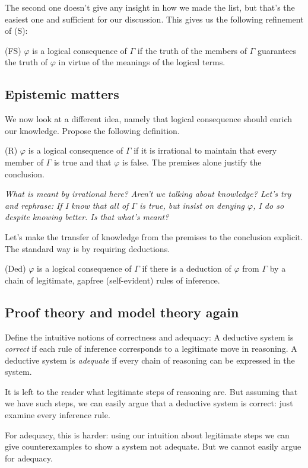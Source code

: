 \documentclass[a4paper]{article}
\begin{document}
The second one doesn't give any insight in how we made the list, but that's
the easiest one and sufficient for our discussion.  This gives us the following
refinement of (S):

(FS) $\varphi$ is a logical consequence of $\Gamma$ if the truth of the members
of $\Gamma$ guarantees the truth of $\varphi$ in virtue of the meanings of the
logical terms.

\subsection{Epistemic matters}

We now look at a different idea, namely that logical consequence should enrich
our knowledge.  Propose the following definition.

(R) $\varphi$ is a logical consequence of $\Gamma$ if it is irrational to
maintain that every member of $\Gamma$ is true and that $\varphi$ is false.  The
premises alone justify the conclusion.

\emph{What is meant by irrational here?  Aren't we talking about knowledge?
Let's try and rephrase:  If I know that all of $\Gamma$ is true, but insist on
denying $\varphi$, I do so despite knowing better.  Is that what's meant?}

Let's make the transfer of knowledge from the premises to the conclusion
explicit.  The standard way is by requiring deductions.

(Ded) $\varphi$ is a logical consequence of $\Gamma$ if there is a deduction of
$\varphi$ from $\Gamma$ by a chain of legitimate, gapfree (self-evident) rules
of inference.

\subsection{Proof theory and model theory again}

Define the intuitive notions of correctness and adequacy: A deductive system is
\emph{correct} if each rule of inference corresponds to a legitimate move in
reasoning.  A deductive system is \emph{adequate} if every chain of reasoning
can be expressed in the system.

It is left to the reader what legitimate steps of reasoning are.  But assuming
that we have such steps, we can easily argue that a deductive system is correct:
just examine every inference rule.

For adequacy, this is harder: using our intuition about legitimate steps we can
give counterexamples to show a system not adequate.  But we cannot easily argue
for adequacy.
\end{document}
